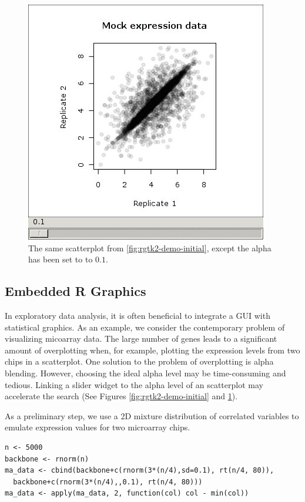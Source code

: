 \documentclass[article]{jss}
\begin{document}
\begin{figure}
\begin{center}
\includegraphics[scale=0.5]{demo-alpha-random-01-3}
\caption{\label{fig:rgtk2-demo-final}The same scatterplot from 
\ref{fig:rgtk2-demo-initial}, except the alpha has been set to to $0.1$.}
\end{center}
\end{figure}

\subsection{Embedded R Graphics}

In exploratory data analysis, it is often beneficial to integrate
a GUI with statistical graphics. As an example, we consider the contemporary
problem of visualizing micoarray data. The large number of genes leads
to a significant amount of overplotting when, for example, plotting
the expression levels from two chips in a scatterplot. One solution
to the problem of overplotting is alpha blending. However, choosing
the ideal alpha level may be time-consuming and tedious. Linking a
slider widget to the alpha level of an  scatterplot may accelerate
the search (See Figures \ref{fig:rgtk2-demo-initial} and \ref{fig:rgtk2-demo-final}). 

As a preliminary step, we use a 2D mixture distribution of correlated variables
to emulate expression values for two microarray chips. 
\begin{verbatim}
n <- 5000
backbone <- rnorm(n)
ma_data <- cbind(backbone+c(rnorm(3*(n/4),sd=0.1), rt(n/4, 80)), 
  backbone+c(rnorm(3*(n/4),,0.1), rt(n/4, 80)))
ma_data <- apply(ma_data, 2, function(col) col - min(col))
\end{verbatim}
\end{document}
